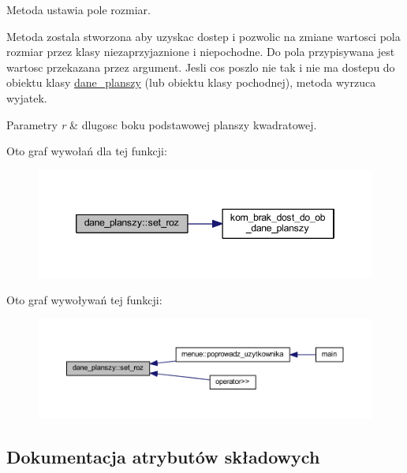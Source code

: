 Metoda ustawia pole rozmiar.

Metoda zostala stworzona aby uzyskac dostep i pozwolic na zmiane wartosci pola rozmiar przez klasy niezaprzyjaznione i niepochodne. Do pola przypisywana jest wartosc przekazana przez argument. Jesli cos poszlo nie tak i nie ma dostepu do obiektu klasy \mbox{\hyperlink{classdane__planszy}{dane\+\_\+planszy}} (lub obiektu klasy pochodnej), metoda wyrzuca wyjatek. 
\begin{DoxyParams}{Parametry}
{\em r} & dlugosc boku podstawowej planszy kwadratowej. \\
\hline
\end{DoxyParams}
Oto graf wywołań dla tej funkcji\+:
\nopagebreak
\begin{figure}[H]
\begin{center}
\leavevmode
\includegraphics[width=346pt]{classdane__planszy_a9516490206327f9bd83eeffc6c8180bb_cgraph}
\end{center}
\end{figure}
Oto graf wywoływań tej funkcji\+:
\nopagebreak
\begin{figure}[H]
\begin{center}
\leavevmode
\includegraphics[width=350pt]{classdane__planszy_a9516490206327f9bd83eeffc6c8180bb_icgraph}
\end{center}
\end{figure}


\subsection{Dokumentacja atrybutów składowych}
\mbox{\label{classdane__planszy_abf638c9ebf42b2b56c093f427310d7a5}} 
